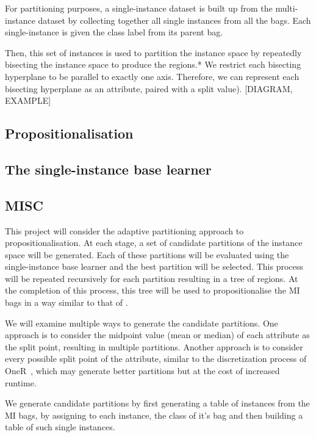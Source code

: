 \documentclass[a4paper,12pt]{article} %
\begin{document}
For partitioning purposes,
    a single-instance dataset is built up from the multi-instance dataset
    by collecting together all single instances from all the bags.
Each single-instance is given the class label from its parent bag.

Then, this set of instances is used to partition the instance space by
    repeatedly bisecting the instance space
    to produce the regions.*
We restrict each bisecting hyperplane to be parallel to exactly one axis.
Therefore, we can represent each bisecting hyperplane as an attribute,
    paired with a split value).
[DIAGRAM, EXAMPLE]

\subsection{Propositionalisation}
\subsection{The single-instance base learner}    
    
\subsection{MISC}
This project will consider the adaptive partitioning approach to propositionalisation.
At each stage, a set of candidate partitions of the instance space will be generated. Each of these partitions will be evaluated using the  single-instance base learner and the best partition will be selected. This process will be repeated recursively for each partition resulting in a tree of regions. At the completion of this process, this tree will be used to propositionalise the MI bags in a way similar to that of .

We will examine multiple ways to generate the candidate partitions. One approach is to consider the midpoint value (mean or median) of each attribute as the split point, resulting in multiple partitions. Another approach is to consider every possible split point of the attribute, similar to the discretization process of OneR~\cite{holte}, which may generate better partitions but at the cost of increased runtime.




We generate candidate partitions by first generating a table of instances from the MI bags, 
    by assigning to each instance, the class of it's bag and then building a table of such 
    single instances. 
    
\end{document}
